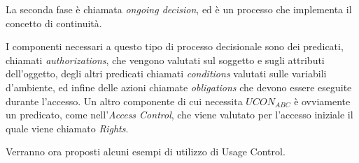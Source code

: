 La seconda fase è chiamata \textit{ongoing decision}, ed è un processo che implementa il concetto di continuità.\par
I componenti necessari a questo tipo di processo decisionale sono dei predicati, chiamati \textit{authorizations}, che vengono valutati sul soggetto e sugli attributi dell'oggetto, degli altri predicati chiamati \textit{conditions} valutati sulle variabili d'ambiente, ed infine delle azioni chiamate \textit{obligations} che devono essere eseguite durante l'accesso.
Un altro componente di cui necessita $UCON_{ABC}$ è ovviamente un predicato, come nell'\textit{Access Control}, che viene valutato per l'accesso iniziale il quale viene chiamato \textit{Rights}.\\ \par
{}
Verranno ora proposti alcuni esempi di utilizzo di Usage Control.

